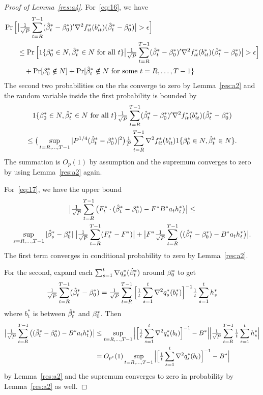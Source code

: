 \documentclass[12pt,fleqn]{article}
\begin{document}
\begin{proof}[Proof of Lemma~\ref{res:a4}]
For~\eqref{eq:16}, we have
\begin{align*}
  \pr\Big[& \big|\oclt{t} (\bh_t^* - \btrue^*)' \nabla^2 f_{it}^*(b_{it}^*) (\bh_t^* - \btrue^*) \big| > \epsilon \Big] \\
  &\leq \pr\Big[1\{\btrue^* \in N, \bh_t^* \in N\ \text{for all}\ t\} \big|\oclt{t} (\bh_t^* - \btrue^*)' \nabla^2 f_{it}^*(b_{it}^*) (\bh_t^* - \btrue^*) \big| > \epsilon \Big] \\
  &\quad + \pr[\btrue^* \notin N] + \pr[\bh_t^* \notin N\ \text{for some}\ t = R,\dots,T-1\}
\end{align*}
The second two probabilities on the rhs converge to zero by
Lemma~\ref{res:a2} and the random variable inside the first probability is bounded by
\begin{multline*}
  1\{\beta_0^* \in N, \hat \beta_t^* \in N\ \text{for all}\ t\}
  \tfrac{1}{\sqrt{P}} \sum_{t=R}^{T-1} (\hat \beta_t^* - \beta_0^*)' \nabla^2 f_{it}^*(b_{it}^*) (\hat \beta_t^* - \beta_0^*)
  \\ \leq
  \big(\sup_{t=R,\dots,T-1} |P^{1/4}(\hat \beta_t^* - \beta_0^*)|^2\big) \tfrac{1}{P} \sum_{t=R}^{T-1}  \nabla^2 f_{it}^*(b_{it}^*) 1\{\beta_0^* \in N, \hat \beta_t^* \in N\}.
\end{multline*}
The summation is $O_p(1)$ by assumption and the supremum converges to
zero by using Lemma~\ref{res:a2} again.

For~\eqref{eq:17}, we have the upper bound
\begin{multline*}
  \big\lvert \tfrac{1}{\sqrt{P}} \sum_{t=R}^{T-1} \big(F_t^* \cdot (\hat \beta_t^* - \beta_0^*) - F^* B^* a_t h_t^*\big) \big\rvert \leq \\
   \sup_{s=R,\dots,T-1} |\hat \beta_s^* - \beta_0^*|\; \big\lvert \tfrac{1}{\sqrt{P}} \sum_{t=R}^{T-1} (F_t^* - F^*) \big\rvert
  + \big\lvert F^* \tfrac{1}{\sqrt{P}} \sum_{t=R}^{T-1} \big((\hat \beta_t^* - \beta_0^*) - B^* a_t h_t^*\big) \big\rvert.
\end{multline*}
The first term converges in conditional probability to zero by
Lemma~\ref{res:a2}.

For the second, expand each $\sum_{s=1}^t \nabla q_s^*(\hat \beta_t^*)$
around $\beta_0^*$ to get
\begin{equation*}
  \tfrac{1}{\sqrt{P}} \sum_{t=R}^{T-1} (\hat \beta_t^* - \beta_0^*)
  = \tfrac{1}{\sqrt{P}} \sum_{t=R}^{T-1} \Big[\tfrac{1}{t} \sum_{s=1}^t \nabla^2 q_s^*(b_t^*)\Big]^{-1} \tfrac{1}{t} \sum_{s=1}^t h_s^*
\end{equation*}
where $b_t^*$ is between $\hat \beta_t^*$ and $\beta_0^*$. Then
\begin{align*}
  \big\lvert \tfrac{1}{\sqrt{P}} \sum_{t=R}^{T-1} \big((\hat \beta_t^* - \beta_0^*) - B^* a_t h_t^*\big) \big\rvert
  &\leq \sup_{t=R,\dots,T-1} \Big\lvert\Big[\tfrac{1}{t} \sum_{s=1}^t \nabla^2 q_s^*(b_t)\Big]^{-1} - B^*\Big\rvert
  \Big\lvert\tfrac{1}{\sqrt{P}} \sum_{t=R}^{T-1} \tfrac{1}{t} \sum_{s=1}^t h_s^* \Big\rvert \\
  &= O_{p^*}(1) \sup_{t=R,\dots,T-1} \Big\lvert\Big[\tfrac{1}{t} \sum_{s=1}^t \nabla^2 q_s^*(b_t)\Big]^{-1} - B^*\Big\rvert
\end{align*}
by Lemma~\ref{res:a2} and the supremum converges to zero in
probability by Lemma~\ref{res:a2} as well.
\end{proof}
\end{document}
